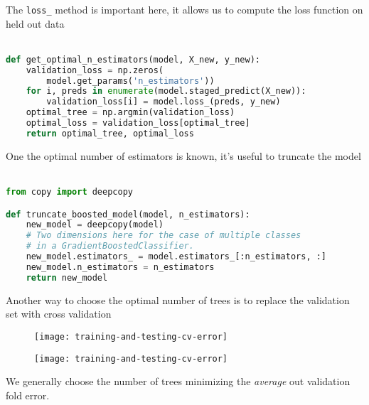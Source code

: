 %
\begin{frame}[fragile]
The \texttt{loss\_} method is important here, it allows us to compute the loss function on held out data\\~\\

\begin{lstlisting}[language=python]
def get_optimal_n_estimators(model, X_new, y_new):
    validation_loss = np.zeros(
        model.get_params('n_estimators'))
    for i, preds in enumerate(model.staged_predict(X_new)):
        validation_loss[i] = model.loss_(preds, y_new)    
    optimal_tree = np.argmin(validation_loss)
    optimal_loss = validation_loss[optimal_tree]
    return optimal_tree, optimal_loss
\end{lstlisting}

\end{frame}
%
\begin{frame}[fragile]
One the optimal number of estimators is known, it's useful to truncate the model\\~\\

\begin{lstlisting}[language=python]
from copy import deepcopy

def truncate_boosted_model(model, n_estimators):
    new_model = deepcopy(model)
    # Two dimensions here for the case of multiple classes
    # in a GradientBoostedClassifier.
    new_model.estimators_ = model.estimators_[:n_estimators, :]
    new_model.n_estimators = n_estimators
    return new_model
\end{lstlisting}

\end{frame}
%
\begin{frame}
Another way to choose the optimal number of trees is to replace the validation set with cross validation

  \begin{figure}
    \texttt{[image: training-and-testing-cv-error]}
  \end{figure}
  
\end{frame}
%
\begin{frame}

  \begin{figure}
    \texttt{[image: training-and-testing-cv-error]}
  \end{figure}
  
We generally choose the number of trees minimizing the \textit{average} out validation fold error.

\end{frame}
